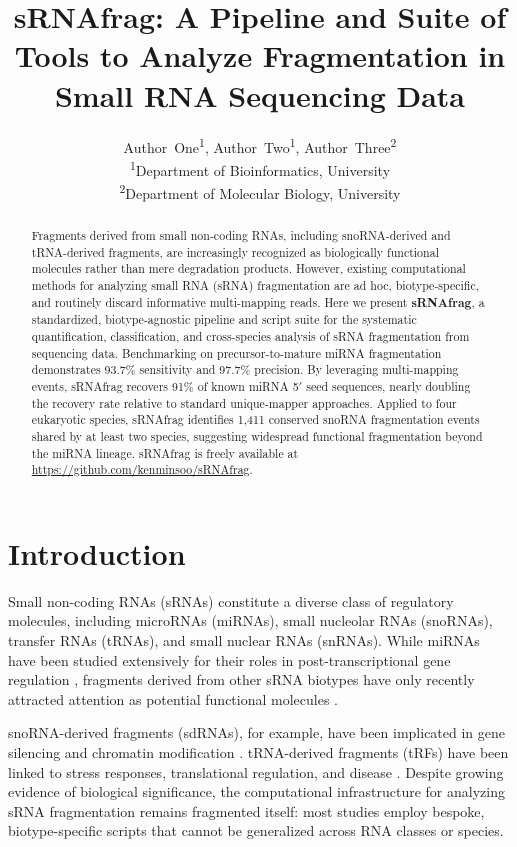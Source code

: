 \documentclass[11pt]{article}
\title{sRNAfrag: A Pipeline and Suite of Tools to Analyze Fragmentation in Small RNA Sequencing Data}
\author{
  Author~One\textsuperscript{1},
  Author~Two\textsuperscript{1},
  Author~Three\textsuperscript{2} \\
  \textsuperscript{1}Department of Bioinformatics, University \\
  \textsuperscript{2}Department of Molecular Biology, University
}
\date{}
\begin{document}
\maketitle

\begin{abstract}
Fragments derived from small non-coding RNAs, including snoRNA-derived and tRNA-derived fragments, are increasingly recognized as biologically functional molecules rather than mere degradation products. However, existing computational methods for analyzing small RNA (sRNA) fragmentation are ad hoc, biotype-specific, and routinely discard informative multi-mapping reads. Here we present \textbf{sRNAfrag}, a standardized, biotype-agnostic pipeline and script suite for the systematic quantification, classification, and cross-species analysis of sRNA fragmentation from sequencing data. Benchmarking on precursor-to-mature miRNA fragmentation demonstrates 93.7\% sensitivity and 97.7\% precision. By leveraging multi-mapping events, sRNAfrag recovers 91\% of known miRNA 5$'$ seed sequences, nearly doubling the recovery rate relative to standard unique-mapper approaches. Applied to four eukaryotic species, sRNAfrag identifies 1,411 conserved snoRNA fragmentation events shared by at least two species, suggesting widespread functional fragmentation beyond the miRNA lineage. sRNAfrag is freely available at \url{https://github.com/kenminsoo/sRNAfrag}.
\end{abstract}

\section{Introduction}

Small non-coding RNAs (sRNAs) constitute a diverse class of regulatory molecules, including microRNAs (miRNAs), small nucleolar RNAs (snoRNAs), transfer RNAs (tRNAs), and small nuclear RNAs (snRNAs). While miRNAs have been studied extensively for their roles in post-transcriptional gene regulation \citep{bartel2009}, fragments derived from other sRNA biotypes have only recently attracted attention as potential functional molecules \citep{kumar2016}.

snoRNA-derived fragments (sdRNAs), for example, have been implicated in gene silencing and chromatin modification \citep{ender2008,taft2009}. tRNA-derived fragments (tRFs) have been linked to stress responses, translational regulation, and disease \citep{lee2009,kumar2016}. Despite growing evidence of biological significance, the computational infrastructure for analyzing sRNA fragmentation remains fragmented itself: most studies employ bespoke, biotype-specific scripts that cannot be generalized across RNA classes or species.
\end{document}
